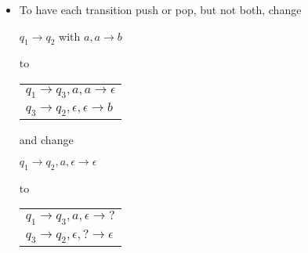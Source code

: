 \begin{frame}[allowframebreaks]
\begin{itemize}
\item  To have each transition push or pop, but not both,
change
\begin{center}
$q_1 \rightarrow q_2$ with $a, a \rightarrow b$ 
\end{center}
to
\begin{center}
  \begin{tabular}{l}
$q_1 \rightarrow q_3, a, a \rightarrow \epsilon$\\
$q_3 \rightarrow q_2, \epsilon, \epsilon \rightarrow b$  
  \end{tabular}
\end{center}
and change 
\begin{center}
$q_1\rightarrow q_2, a, \epsilon \rightarrow \epsilon$ 
\end{center}
to
\begin{center}
  \begin{tabular}{l}
$q_1 \rightarrow q_3, a, \epsilon \rightarrow ?$ \\
$q_3 \rightarrow q_2, \epsilon, ? \rightarrow \epsilon$
  \end{tabular}
\end{center}
  \end{itemize}
\end{frame}




